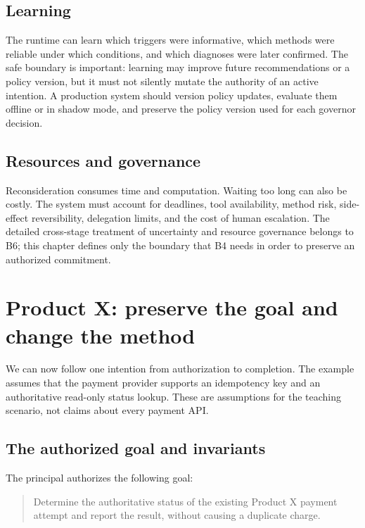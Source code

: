 \subsection{Learning}

The runtime can learn which triggers were informative, which methods were reliable under which conditions, and which diagnoses were later confirmed. The safe boundary is important: learning may improve future recommendations or a policy version, but it must not silently mutate the authority of an active intention. A production system should version policy updates, evaluate them offline or in shadow mode, and preserve the policy version used for each governor decision.

\subsection{Resources and governance}

Reconsideration consumes time and computation. Waiting too long can also be costly. The system must account for deadlines, tool availability, method risk, side-effect reversibility, delegation limits, and the cost of human escalation. The detailed cross-stage treatment of uncertainty and resource governance belongs to B6; this chapter defines only the boundary that B4 needs in order to preserve an authorized commitment.

\section{Product X: preserve the goal and change the method}
\label{sec:ch15-productx}

We can now follow one intention from authorization to completion. The example assumes that the payment provider supports an idempotency key and an authoritative read-only status lookup. These are assumptions for the teaching scenario, not claims about every payment API.

\subsection{The authorized goal and invariants}

The principal authorizes the following goal:

\begin{quote}
Determine the authoritative status of the existing Product X payment attempt and report the result, without causing a duplicate charge.
\end{quote}

